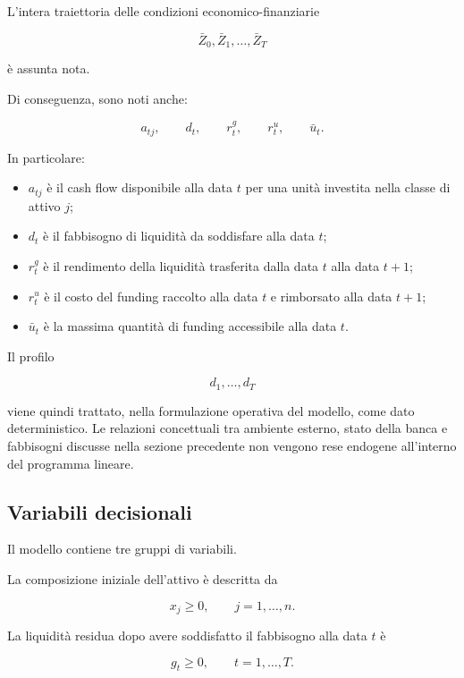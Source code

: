 L'intera traiettoria delle condizioni economico-finanziarie

\[
\bar Z_0,\bar Z_1,\ldots,\bar Z_T
\]

\noindent \`e assunta nota.

Di conseguenza, sono noti anche:

\[
a_{tj},
\qquad
d_t,
\qquad
r^g_t,
\qquad
r^u_t,
\qquad
\bar u_t.
\]

In particolare:

\begin{itemize}

\item $a_{tj}$ \`e il cash flow disponibile alla data $t$ per una unit\`a
investita nella classe di attivo $j$;

\item $d_t$ \`e il fabbisogno di liquidit\`a da soddisfare alla data $t$;

\item $r^g_t$ \`e il rendimento della liquidit\`a trasferita dalla data $t$
alla data $t+1$;

\item $r^u_t$ \`e il costo del funding raccolto alla data $t$ e rimborsato
alla data $t+1$;

\item $\bar u_t$ \`e la massima quantit\`a di funding accessibile alla data
$t$.

\end{itemize}

Il profilo

\[
d_1,\ldots,d_T
\]

\noindent viene quindi trattato, nella formulazione operativa del modello, come dato
deterministico. Le relazioni concettuali tra ambiente esterno, stato della
banca e fabbisogni discusse nella sezione precedente non vengono rese
endogene all'interno del programma lineare.

\subsection{Variabili decisionali}

Il modello contiene tre gruppi di variabili.

La composizione iniziale dell'attivo \`e descritta da

\[
x_j\geq0,
\qquad
j=1,\ldots,n.
\]

La liquidit\`a residua dopo avere soddisfatto il fabbisogno alla data $t$ \`e

\[
g_t\geq0,
\qquad
t=1,\ldots,T.
\]

